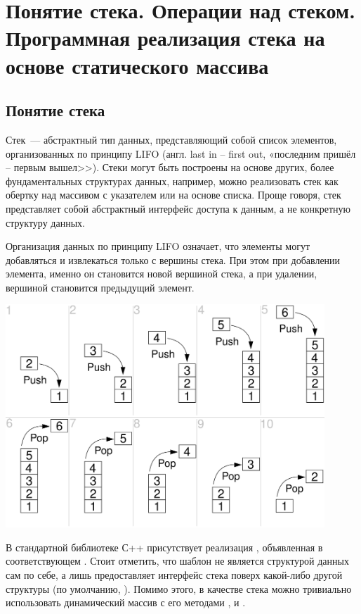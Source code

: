 %
%

\section{Понятие стека. Операции над стеком. Программная реализация стека на основе статического массива}
\subsection{Понятие стека}
Стек~--- абстрактный тип данных, представляющий собой список элементов, организованных по принципу
LIFO (англ. last in -- first out, «последним пришёл -- первым вышел>>). Стеки могут быть построены на основе других, более фундаментальных
структурах данных, например, можно реализовать стек как обертку над массивом с указателем или на основе списка. Проще говоря, стек представляет
собой абстрактный интерфейс доступа к данным, а не конкретную структуру данных.

Организация данных по принципу LIFO означает, что элементы могут добавляться и извлекаться только с вершины стека. При этом при добавлении
элемента, именно он становится новой вершиной стека, а при удалении, вершиной становится предыдущий элемент.

\includegraphics[width=0.9\textwidth]{resources/19-26/stack.png}

В стандартной библиотеке С++ присутствует реализация , объявленная в соответствующем
. Стоит отметить, что шаблон  не является
структурой данных сам по себе, а лишь предоставляет интерфейс стека поверх какой-либо другой структуры (по умолчанию, ).
Помимо этого, в качестве стека можно тривиально использовать динамический массив  с его
методами ,  и .
